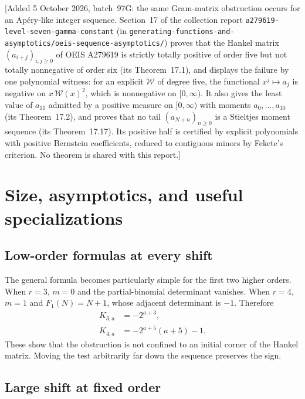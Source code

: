 \documentclass[11pt,a4paper]{article}
\theoremstyle{definition}
\numberwithin{equation}{section}
\begin{document}
[Added 5 October 2026, batch~97G: the same Gram-matrix obstruction occurs
for an Ap\'ery-like integer sequence. Section~17 of the collection report
\texttt{a279619-\allowbreak level-\allowbreak seven-\allowbreak gamma-\allowbreak constant}
(in \texttt{generating-functions-\allowbreak and-\allowbreak asymptotics/\allowbreak oeis-\allowbreak sequence-\allowbreak asymptotics/})
proves that the Hankel matrix $(a_{i+j})_{i,j\ge0}$ of OEIS A279619 is
strictly totally positive of order five but not totally nonnegative of
order six (its Theorem~17.1), and displays the failure by one polynomial
witness: for an explicit $\mathcal W$ of degree five, the functional
$x^j\mapsto a_j$ is negative on $x\,\mathcal W(x)^2$, which is nonnegative
on $[0,\infty)$. It also gives the least value of $a_{11}$ admitted by a
positive measure on $[0,\infty)$ with moments $a_0,\dots,a_{10}$ (its
Theorem~17.2), and proves that no tail $(a_{N+n})_{n\ge0}$ is a Stieltjes
moment sequence (its Theorem~17.17). Its positive half is certified by
explicit polynomials with positive Bernstein coefficients, reduced to
contiguous minors by Fekete's criterion. No theorem is shared with this
report.]

\section{Size, asymptotics, and useful specializations}
\label{sec:asymptotics}

\subsection{Low-order formulas at every shift}

The general formula becomes particularly simple for the first two
higher orders. When $r=3$, $m=0$ and the partial-binomial determinant
vanishes. When $r=4$, $m=1$ and $F_1(N)=N+1$, whose adjacent determinant
is $-1$. Therefore
\begin{align}
 K_{3,a}&=-2^{a+3},\label{eq:r3-all}\\
 K_{4,a}&=-2^{a+5}(a+5)-1.\label{eq:r4-all}
\end{align}
These show that the obstruction is not confined to an initial corner of
the Hankel matrix. Moving the test arbitrarily far down the sequence
preserves the sign.

\subsection{Large shift at fixed order}
\end{document}
